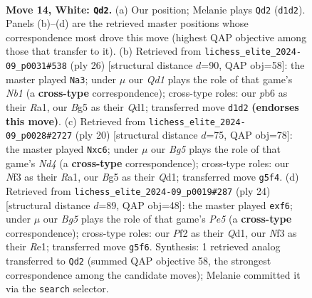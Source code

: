 \documentclass[11pt]{article}
\begin{document}
\clearpage

\begin{figure}[p]\centering
\begin{subfigure}{0.46\textwidth}\centering
\resizebox{\linewidth}{!}{%
\newchessgame
\chessboard[
  setfen={1nbq1rk1/r3bppp/pp1p4/4p1B1/PP2P1n1/2NB1N2/2P2PPP/R2Q1RK1 w - - 2 14},
  showmover=false,
  pgfstyle=straightmove, color=movearrow, markmove={d1-d2}
]}
\caption{}
\end{subfigure}\hfill
\begin{subfigure}{0.46\textwidth}\centering
\resizebox{\linewidth}{!}{%
\newchessgame
\chessboard[
  setfen={r1bq1rk1/1p3pp1/2pb3p/p1n1p3/P3P1n1/2P2N2/1PB2PPP/RNBQ1RK1 w - - 8 14},
  showmover=false,
  pgfstyle=straightmove, color=movearrow, markmove={b1-a3}
]}
\caption{}
\end{subfigure}
\\[4pt]
\begin{subfigure}{0.46\textwidth}\centering
\resizebox{\linewidth}{!}{%
\newchessgame
\chessboard[
  setfen={r1bq1rk1/1p2ppbp/2np2p1/p7/P2NP1n1/1BN1B3/1PP2PPP/R2Q1RK1 w - - 2 11},
  showmover=false,
  pgfstyle=straightmove, color=movearrow, markmove={d4-c6}
]}
\caption{}
\end{subfigure}\hfill
\begin{subfigure}{0.46\textwidth}\centering
\resizebox{\linewidth}{!}{%
\newchessgame
\chessboard[
  setfen={r1b2rk1/pp1nq1bp/2n1ppp1/2p1P1B1/2N5/2PB1N2/PP3PPP/R2QR1K1 w - - 0 13},
  showmover=false,
  pgfstyle=straightmove, color=movearrow, markmove={e5-f6}
]}
\caption{}
\end{subfigure}
\caption{\textbf{Move 14, White: \texttt{Qd2}.} (a) Our position; Melanie plays \texttt{Qd2} (\texttt{d1d2}). Panels (b)--(d) are the retrieved master positions whose correspondence most drove this move (highest QAP objective among those that transfer to it). (b) Retrieved from \texttt{lichess\_elite\_2024-09\_p0031\#538} (ply 26) [structural distance $d$=90, QAP obj=58]: the master played \texttt{Na3}; under $\mu$ our \emph{Qd1} plays the role of that game's \emph{Nb1} (a \textbf{cross-type} correspondence); cross-type roles: our \emph{p}b6 as their \emph{R}a1, our \emph{B}g5 as their \emph{Q}d1; transferred move \texttt{d1d2} \textbf{(endorses this move)}. (c) Retrieved from \texttt{lichess\_elite\_2024-09\_p0028\#2727} (ply 20) [structural distance $d$=75, QAP obj=78]: the master played \texttt{Nxc6}; under $\mu$ our \emph{Bg5} plays the role of that game's \emph{Nd4} (a \textbf{cross-type} correspondence); cross-type roles: our \emph{N}f3 as their \emph{R}a1, our \emph{B}g5 as their \emph{Q}d1; transferred move \texttt{g5f4}. (d) Retrieved from \texttt{lichess\_elite\_2024-09\_p0019\#287} (ply 24) [structural distance $d$=89, QAP obj=48]: the master played \texttt{exf6}; under $\mu$ our \emph{Bg5} plays the role of that game's \emph{Pe5} (a \textbf{cross-type} correspondence); cross-type roles: our \emph{P}f2 as their \emph{Q}d1, our \emph{N}f3 as their \emph{R}e1; transferred move \texttt{g5f6}. Synthesis: 1 retrieved analog transferred to \texttt{Qd2} (summed QAP objective 58, the strongest correspondence among the candidate moves); Melanie committed it via the \texttt{search} selector.}
\label{fig:thought-m26}
\end{figure}
\end{document}
